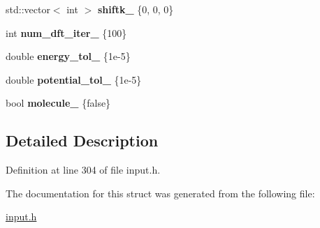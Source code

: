 \begin{DoxyCompactItemize}
\item 
\hypertarget{structsirius_1_1_parameters__input__section_a6e399b3c42fff9cb6590630b4541e265}{}std\+::vector$<$ int $>$ {\bfseries shiftk\+\_\+} \{0, 0, 0\}\label{structsirius_1_1_parameters__input__section_a6e399b3c42fff9cb6590630b4541e265}

\item 
\hypertarget{structsirius_1_1_parameters__input__section_aa184a676cdc1d59fcd712db24b77feba}{}int {\bfseries num\+\_\+dft\+\_\+iter\+\_\+} \{100\}\label{structsirius_1_1_parameters__input__section_aa184a676cdc1d59fcd712db24b77feba}

\item 
\hypertarget{structsirius_1_1_parameters__input__section_a04417d94fb1a2bc5ef5becac6d7f4ee4}{}double {\bfseries energy\+\_\+tol\+\_\+} \{1e-\/5\}\label{structsirius_1_1_parameters__input__section_a04417d94fb1a2bc5ef5becac6d7f4ee4}

\item 
\hypertarget{structsirius_1_1_parameters__input__section_a842e04a8d6c90ef1f868577a845deb68}{}double {\bfseries potential\+\_\+tol\+\_\+} \{1e-\/5\}\label{structsirius_1_1_parameters__input__section_a842e04a8d6c90ef1f868577a845deb68}

\item 
\hypertarget{structsirius_1_1_parameters__input__section_ad8ebbbd1654860acc7022c923f8017e9}{}bool {\bfseries molecule\+\_\+} \{false\}\label{structsirius_1_1_parameters__input__section_ad8ebbbd1654860acc7022c923f8017e9}

\end{DoxyCompactItemize}


\subsection{Detailed Description}


Definition at line 304 of file input.\+h.



The documentation for this struct was generated from the following file\+:\begin{DoxyCompactItemize}
\item 
\hyperlink{input_8h}{input.\+h}\end{DoxyCompactItemize}
